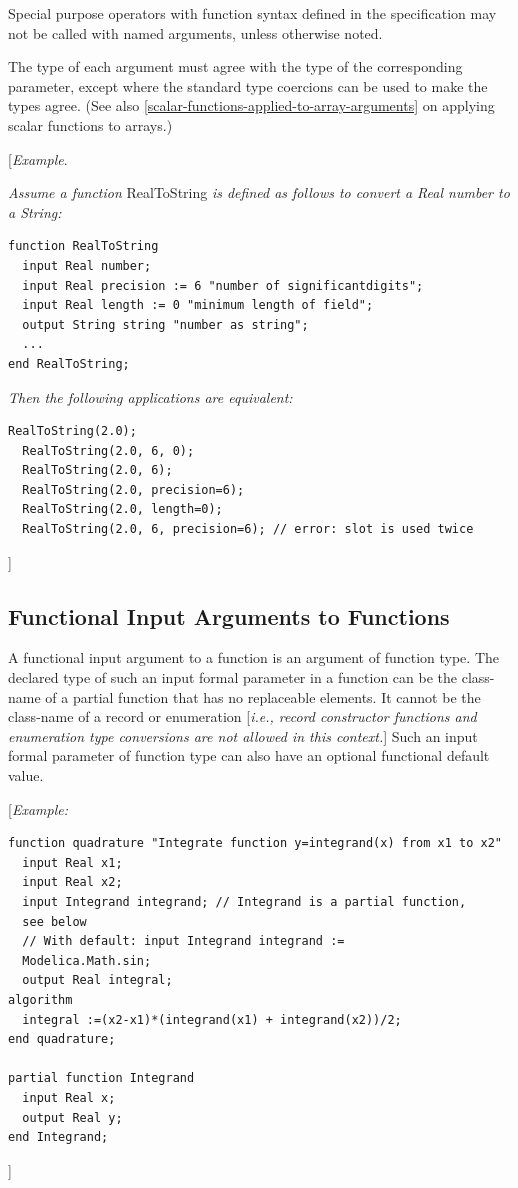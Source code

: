 \documentclass[10pt,a4paper]{report}
\def\doublelabel#1{\label{#1}}
\begin{document}
Special purpose operators with function syntax defined in the
specification may not be called with named arguments, unless otherwise
noted.

The type of each argument must agree with the type of the corresponding
parameter, except where the standard type coercions can be used to make
the types agree. (See also \ref{scalar-functions-applied-to-array-arguments} on applying scalar functions
to arrays.)

{[}\emph{Example}.

\emph{Assume a function} RealToString \emph{is defined as follows to
convert a Real number to a String:}

\begin{lstlisting}[language=modelica]
function RealToString
  input Real number;
  input Real precision := 6 "number of significantdigits";
  input Real length := 0 "minimum length of field";
  output String string "number as string";
  ...
end RealToString;
\end{lstlisting}
\emph{Then the following applications are equivalent:}

\begin{lstlisting}[language=modelica]
  RealToString(2.0);
  RealToString(2.0, 6, 0);
  RealToString(2.0, 6);
  RealToString(2.0, precision=6);
  RealToString(2.0, length=0);
  RealToString(2.0, 6, precision=6); // error: slot is used twice
\end{lstlisting}
{]}

\subsection{Functional Input Arguments to Functions}\doublelabel{functional-input-arguments-to-functions}

A functional input argument to a function is an argument of function
type. The declared type of such an input formal parameter in a function
can be the class-name of a partial function that has no replaceable
elements. It cannot be the class-name of a record or enumeration
{[}\emph{i.e., record constructor functions and enumeration type
conversions are not allowed in this context.}{]} Such an input formal
parameter of function type can also have an optional functional default
value.

{[}\emph{Example:}

\begin{lstlisting}[language=modelica]
  function quadrature "Integrate function y=integrand(x) from x1 to x2"
  input Real x1;
  input Real x2;
  input Integrand integrand; // Integrand is a partial function,
  see below
  // With default: input Integrand integrand :=
  Modelica.Math.sin;
  output Real integral;
algorithm
  integral :=(x2-x1)*(integrand(x1) + integrand(x2))/2;
end quadrature;

partial function Integrand
  input Real x;
  output Real y;
end Integrand;
\end{lstlisting}
{]}
\end{document}
